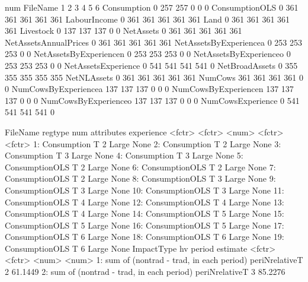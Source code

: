 \begin{Schunk}
\begin{Soutput}
                        num
FileName                   1   2   3   4   5   6
  Consumption              0 257 257   0   0   0
  ConsumptionOLS           0 361 361 361 361 361
  LabourIncome             0 361 361 361 361 361
  Land                     0 361 361 361 361 361
  Livestock                0 137 137 137   0   0
  NetAssets                0 361 361 361 361 361
  NetAssetsAnnualPrices    0 361 361 361 361 361
  NetAssetsByExperiencea   0 253 253 253   0   0
  NetAssetsByExperiencen   0 253 253 253   0   0
  NetAssetsByExperienceo   0 253 253 253   0   0
  NetAssetsExperience      0 541 541 541 541   0
  NetBroadAssets           0 355 355 355 355 355
  NetNLAssets              0 361 361 361 361 361
  NumCows                361 361 361 361   0   0
  NumCowsByExperiencea   137 137 137   0   0   0
  NumCowsByExperiencen   137 137 137   0   0   0
  NumCowsByExperienceo   137 137 137   0   0   0
  NumCowsExperience        0 541 541 541 541   0
\end{Soutput}
\begin{Soutput}
          FileName regtype   num attributes experience
            <fctr>  <fctr> <num>     <fctr>     <fctr>
 1:    Consumption       T     2      Large       None
 2:    Consumption       T     2      Large       None
 3:    Consumption       T     3      Large       None
 4:    Consumption       T     3      Large       None
 5: ConsumptionOLS       T     2      Large       None
 6: ConsumptionOLS       T     2      Large       None
 7: ConsumptionOLS       T     2      Large       None
 8: ConsumptionOLS       T     3      Large       None
 9: ConsumptionOLS       T     3      Large       None
10: ConsumptionOLS       T     3      Large       None
11: ConsumptionOLS       T     4      Large       None
12: ConsumptionOLS       T     4      Large       None
13: ConsumptionOLS       T     4      Large       None
14: ConsumptionOLS       T     5      Large       None
15: ConsumptionOLS       T     5      Large       None
16: ConsumptionOLS       T     5      Large       None
17: ConsumptionOLS       T     6      Large       None
18: ConsumptionOLS       T     6      Large       None
19: ConsumptionOLS       T     6      Large       None
                                 ImpactType             hv period estimate
                                     <fctr>         <fctr>  <num>    <num>
 1: sum of (nontrad - trad, in each period) periNrelativeT      2  61.1449
 2: sum of (nontrad - trad, in each period) periNrelativeT      3  85.2276

\end{Soutput}
\end{Schunk}
